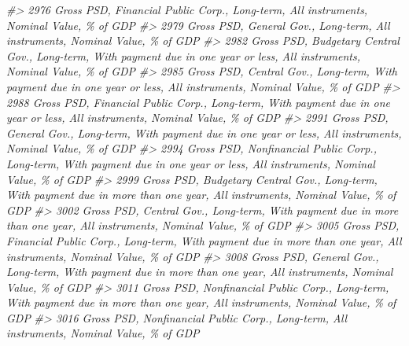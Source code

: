 \documentclass[
]{bxjsbook}
\newenvironment{Shaded}{\begin{snugshade}}{\end{snugshade}}
\newcommand{\CommentTok}[1]{\textcolor[rgb]{0.56,0.35,0.01}{\textit{#1}}}
\theoremstyle{definition}
\theoremstyle{definition}
\theoremstyle{definition}
\theoremstyle{definition}
\theoremstyle{remark}
\begin{document}
\begin{Shaded}
\begin{Highlighting}[]
\CommentTok{\#\textgreater{} 2976                                                                                     Gross PSD, Financial Public Corp., Long{-}term, All instruments, Nominal Value, \% of GDP}
\CommentTok{\#\textgreater{} 2979                                                                                               Gross PSD, General Gov., Long{-}term, All instruments, Nominal Value, \% of GDP}
\CommentTok{\#\textgreater{} 2982                                               Gross PSD, Budgetary Central Gov., Long{-}term, With payment due in one year or less, All instruments, Nominal Value, \% of GDP}
\CommentTok{\#\textgreater{} 2985                                                         Gross PSD, Central Gov., Long{-}term, With payment due in one year or less, All instruments, Nominal Value, \% of GDP}
\CommentTok{\#\textgreater{} 2988                                               Gross PSD, Financial Public Corp., Long{-}term, With payment due in one year or less, All instruments, Nominal Value, \% of GDP}
\CommentTok{\#\textgreater{} 2991                                                         Gross PSD, General Gov., Long{-}term, With payment due in one year or less, All instruments, Nominal Value, \% of GDP}
\CommentTok{\#\textgreater{} 2994                                            Gross PSD, Nonfinancial Public Corp., Long{-}term, With payment due in one year or less, All instruments, Nominal Value, \% of GDP}
\CommentTok{\#\textgreater{} 2999                                             Gross PSD, Budgetary Central Gov., Long{-}term, With payment due in more than one year, All instruments, Nominal Value, \% of GDP}
\CommentTok{\#\textgreater{} 3002                                                       Gross PSD, Central Gov., Long{-}term, With payment due in more than one year, All instruments, Nominal Value, \% of GDP}
\CommentTok{\#\textgreater{} 3005                                             Gross PSD, Financial Public Corp., Long{-}term, With payment due in more than one year, All instruments, Nominal Value, \% of GDP}
\CommentTok{\#\textgreater{} 3008                                                       Gross PSD, General Gov., Long{-}term, With payment due in more than one year, All instruments, Nominal Value, \% of GDP}
\CommentTok{\#\textgreater{} 3011                                          Gross PSD, Nonfinancial Public Corp., Long{-}term, With payment due in more than one year, All instruments, Nominal Value, \% of GDP}
\CommentTok{\#\textgreater{} 3016                                                                                  Gross PSD, Nonfinancial Public Corp., Long{-}term, All instruments, Nominal Value, \% of GDP}

\end{Highlighting}
\end{Shaded}
\end{document}
